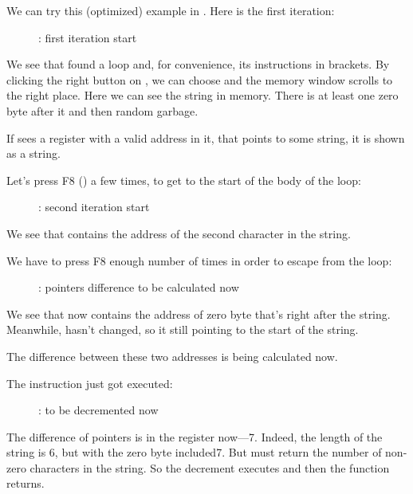 ﻿\clearpage
{}
\myindex{\olly}

We can try this (optimized) example in \olly.  Here is the first iteration:

\begin{figure}[H]
\centering
{}
\caption{\olly: first iteration start}
\label{fig:strlen_olly_1}
\end{figure}

We see that \olly found a loop and, for convenience,  its instructions in brackets.
By clicking the right button on \EAX, we can choose 
 and the memory window scrolls to the right place.
Here we can see the string  in memory.
There is at least
one zero byte after it and then random garbage.

If \olly sees a register with a valid address in it, that points to some string, 
it is shown as a string.

\clearpage
Let's press F8 (\stepover) a few times, to get to the start of the body of the loop:

\begin{figure}[H]
\centering
{}
\caption{\olly: second iteration start}
\label{fig:strlen_olly_2}
\end{figure}

We see that \EAX contains the address of the second character in the string.

\clearpage

We have to press F8 enough number of times in order to escape from the loop:

\begin{figure}[H]
\centering
{}
\caption{\olly: pointers difference to be calculated now}
\label{fig:strlen_olly_3}
\end{figure}

We see that \EAX now contains the address of zero byte that's right after the string.
Meanwhile, \EDX hasn't changed,
so it still pointing to the start of the string.

The difference between these two addresses is being calculated now.

\clearpage
The \SUB instruction just got executed:

\begin{figure}[H]
\centering
{}
\caption{\olly: \EAX to be decremented now}
\label{fig:strlen_olly_4}
\end{figure}

The difference of pointers is in the \EAX register now---7.
Indeed, the length of the  string is 6, 
but with the zero byte included\EMDASH{}7.
But  must return the number of non-zero characters in the string.
So the decrement executes and then the function returns.
